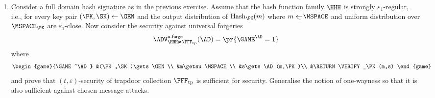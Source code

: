 \documentclass{article}
\newcommand{\FFFTP}{\FFF_{\mathrm{tp}}}
\newcommand{\HASH}{\mathrm{Hash}}
\begin{document}
\begin{enumerate}
\item Consider a full domain hash signature as in the previous
  exercise. Assume that the hash function family $\HHH$ is strongly
  $\varepsilon_1$-regular, i.e., for every key pair
  $(\PK,\SK)\gets\GEN$ and the output distribution of $\HASH_\PK(m)$
  where $m\getsu\MSPACE$ and uniform distribution over $\MSPACE_\PK$
  are $\varepsilon_1$-close. Now consider the security against
  universal forgeries
    \begin{align*}
      \advUFORGEXX{\HHH\Join\FFFTP}{\AD}=\pr{\GAME^\AD=1}
    \end{align*}
   where
   \begin{align*}
     \begin{game}{\GAME^\AD}
       &(\PK,\SK)\gets\GEN\\
       &m\getsu\MSPACE\\
       &s\gets\AD(m,\PK)\\
       &\RETURN \VERIFY_\PK(m,s)
     \end{game}
   \end{align*}
   and prove that $(t,\varepsilon)$-security of trapdoor collection
   $\FFFTP$ is sufficient for security. Generalise the notion of
   one-wayness so that it is also sufficient against chosen message
   attacks.




\end{enumerate}
\end{document}
